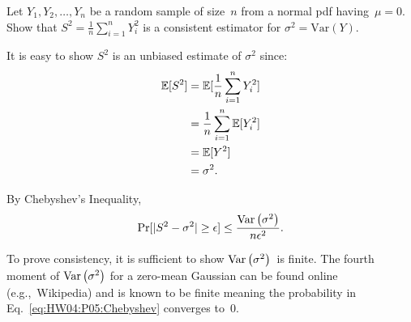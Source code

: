 \begin{problem}
   Let ${Y_1,Y_2,\ldots,Y_n}$ be a random sample of size~$n$ from a normal pdf having~${\mu = 0}$.  Show that ${S^2 = \frac{1}{n} \sum_{i=1}^{n} Y_{i}^2}$ is a consistent estimator for ${\sigma^{2} = \text{Var}(Y)}$.
\end{problem}

It is easy to show $S^2$ is an unbiased estimate of $\sigma^2$ since:
\begin{align}
  \mathbb{E}\lbrack S^2\rbrack &= \mathbb{E}\lbrack\frac{1}{n} \sum_{i=1}^{n} Y_{i}^{2}\rbrack \\
               &= \frac{1}{n} \sum_{i=1}^{n} \mathbb{E}\lbrack Y_{i}^{2}\rbrack \\
               &= \mathbb{E}\lbrack Y^2\rbrack \\
               &= \sigma^{2} \text{.}
\end{align}

By Chebyshev's Inequality,
\begin{equation}\label{eq:HW04:P05:Chebyshev}
  \Pr\lbrack\lvert S^2 - \sigma^2\rvert \geq \epsilon\rbrack \leq \frac{\text{Var}\left(\sigma^2\right)}{n\epsilon^2}\text{.}
\end{equation}

To prove consistency, it is sufficient to show $\text{Var}\left(\sigma^2\right)$~is finite. The fourth moment of $\text{Var}\left(\sigma^2\right)$ for a zero-mean Gaussian can be found online (e.g.,~Wikipedia) and is known to be finite meaning the probability in Eq.~\eqref{eq:HW04:P05:Chebyshev} converges to~0.
